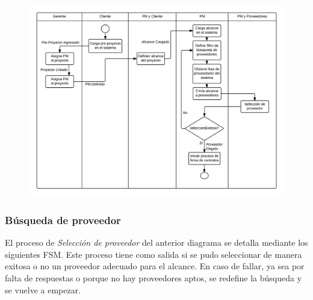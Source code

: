 \begin{figure}[H]
\includegraphics[width=\linewidth]{diag/nuevos/act-busqprov.png}
\label{act-busqprov}
\end{figure}

		\subsubsection{Búsqueda de proveedor}
El proceso de \textit{Selección de proveedor} del anterior diagrama se detalla mediante 
los siguientes FSM. Este proceso tiene como salida si se pudo seleccionar de 
manera exitosa o no un proveedor adecuado para el alcance. En caso de fallar, ya sea 
por falta de respuestas o porque no hay proveedores aptos, se redefine la búsqueda y 
se vuelve a empezar. 

